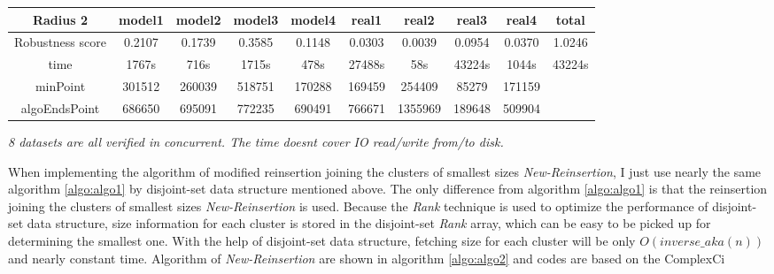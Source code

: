 \documentclass{article}
\begin{document}
\begin{table}[!htbp]
\begin{adjustwidth}{-1cm}{}
\begin{threeparttable}
\begin{tabular}{|c|c|c|c|c|c|c|c|c|c|}
				\textbf{Radius 2} & \textbf{model1} & \textbf{model2} & \textbf{model3} & \textbf{model4} & \textbf{real1} & \textbf{real2} & \textbf{real3} & \textbf{real4} & \textbf{total} \\ \hline
				Robustness score                 & 0.2107    & 0.1739    & 0.3585    & 0.1148    & 0.0303    & 0.0039    & 0.0954    & 0.0370    & 1.0246    \\ \hline
				
				time                             & 1767s     & 716s      & 1715s     & 478s      & 27488s    & 58s       & 43224s    & 1044s     & 43224s    \\ \hline
				
				minPoint                         & 301512          & 260039          & 518751          & 170288          & 169459         & 254409         & 85279          & 171159         &                \\ \hline
				algoEndsPoint                    & 686650          & 695091          & 772235          & 690491          & 766671         & 1355969        & 189648         & 509904         &                \\ \hline
				
			\end{tabular}
			\begin{tablenotes}
				\small
				\item\textit{ 8 datasets are all verified in concurrent. The time doesn\textquotesingle t cover IO read/write from/to disk.}
			\end{tablenotes}			
		\end{threeparttable}
	\end{adjustwidth}	
	\end{table}
	 
	 
	 When implementing the algorithm of modified reinsertion joining the clusters of smallest sizes \textit{New-Reinsertion}, I just use nearly the same algorithm \ref{algo:algo1} by disjoint-set data structure mentioned above. The only difference from algorithm \ref{algo:algo1} is that the reinsertion joining the clusters of smallest sizes \textit{New-Reinsertion} is used. Because the \textit{Rank} technique is used to optimize the performance of disjoint-set data structure, size information for each cluster is stored in the disjoint-set \textit{Rank} array, which can be easy to be picked up for determining the smallest one. With the help of disjoint-set data structure, fetching size for each cluster will be only $O(inverse\_aka(n))$ and nearly constant time. Algorithm of \textit{New-Reinsertion} are shown in algorithm \ref{algo:algo2} and codes are based on the ComplexCi
	 
\end{document}
